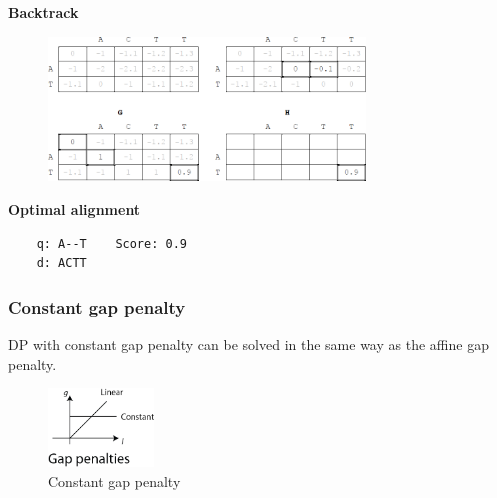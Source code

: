 \textbf{Backtrack}
\begin{figure}[H]
  \centering
      \includegraphics[width=0.75\textwidth]{fig03/affine_dp_backtrack.png}
\end{figure}
\null \medskip 

\textbf{Optimal alignment}
\begin{verbatim}
    q: A--T    Score: 0.9
    d: ACTT
\end{verbatim}

%
%
\subsubsection*{Constant gap penalty}
DP with constant gap penalty can be solved in the same way as the affine gap penalty.
\begin{figure}[H]
  \centering
      \includegraphics[width=0.25\textwidth]{fig03/gap_penalty_constant.png}
  \caption{Constant gap penalty}
\end{figure}

%

